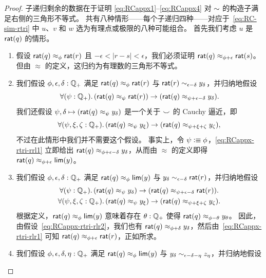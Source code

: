 \begin{proof}
  子递归剩余的数据在于证明 \eqref{eq:RCappx1}--\eqref{eq:RCappx4} 对 $\mathord\sim$ 的构造子满足右侧的三角形不等式。
  共有八种情形——每个子递归四种——对应于~\eqref{eq:RC-sim-rtri} 中 $u$、$v$ 和 $w$ 选为有理点或极限的八种可能组合。
  首先我们考虑 $u$ 是 $\mathsf{rat}(q)$ 的情形。
  \begin{enumerate}
  \item 假设 $\mathsf{rat}(q)\approx_\phi \mathsf{rat}(r)$ 且 $-\epsilon<|r-s|<\epsilon$，我们必须证明 $\mathsf{rat}(q)\approx_{\phi+\epsilon} \mathsf{rat}(s)$。
    但由 $\approx$ 的定义，这归约为有理数的三角形不等式。
  \item 我们假设 $\phi,\epsilon,\delta:\mathbb{Q}_{+}$ 满足 $\mathsf{rat}(q)\approx_\phi \mathsf{rat}(r)$ 与 $\mathsf{rat}(r) \sim_{\epsilon-\delta} y_\delta$，并归纳地假设
    \begin{equation}
      \fall{\psi:\Qp}(\rcrat(q) \approx_{\psi} \rcrat(r)) \to (\rcrat(q) \approx_{\psi+\epsilon-\delta} y_\delta).\label{eq:RCappx-rtri-rrl1}
    \end{equation}
    我们还假设 $\psi,\delta\mapsto (\mathsf{rat}(q) \approx_{\psi} y_\delta)$ 是一个关于 $\smile$ 的 Cauchy 逼近，即
    \begin{equation}
      \fall{\psi,\xi,\zeta:\Qp} (\rcrat(q) \approx_{\psi} y_\xi) \to (\rcrat(q) \approx_{\psi+\xi+\zeta} y_\zeta),\label{eq:RCappx-rtri-rrl2}
    \end{equation}
    不过在此情形中我们并不需要这个假设。
    事实上，令 $\psi\vcentcolon\equiv \phi$，\eqref{eq:RCappx-rtri-rrl1} 立即给出 $\mathsf{rat}(q) \approx_{\phi+\epsilon-\delta} y_\delta$，从而由 $\approx$ 的定义即得 $\mathsf{rat}(q) \approx_{\phi+\epsilon} \mathsf{lim}(y)$。
  \item 我们假设 $\phi,\epsilon,\delta:\mathbb{Q}_{+}$ 满足 $\mathsf{rat}(q)\approx_\phi \mathsf{lim}(y)$ 与 $y_\delta \sim_{\epsilon-\delta} \mathsf{rat}(r)$，并归纳地假设
    \begin{gather}
      \fall{\psi:\Qp}(\rcrat(q) \approx_{\psi} y_\delta) \to (\rcrat(q) \approx_{\psi+\epsilon-\delta} \rcrat(r)).\label{eq:RCappx-rtri-rlr1}\\
      \fall{\psi,\xi,\zeta:\Qp} (\rcrat(q) \approx_{\psi} y_\xi) \to (\rcrat(q) \approx_{\psi+\xi+\zeta} y_\zeta).\label{eq:RCappx-rtri-rlr2}
    \end{gather}
    根据定义，$\mathsf{rat}(q)\approx_\phi \mathsf{lim}(y)$ 意味着存在 $\theta:\mathbb{Q}_{+}$ 使得 $\mathsf{rat}(q) \approx_{\phi-\theta} y_\theta$。
    因此，由假设~\eqref{eq:RCappx-rtri-rlr2}，我们也有 $\mathsf{rat}(q) \approx_{\phi+\delta} y_\delta$，然后由~\eqref{eq:RCappx-rtri-rlr1} 可知 $\mathsf{rat}(q) \approx_{\phi+\epsilon} \mathsf{rat}(r)$，正如所求。
  \item 我们假设 $\phi,\epsilon,\delta,\eta:\mathbb{Q}_{+}$ 满足 $\mathsf{rat}(q)\approx_\phi \mathsf{lim}(y)$ 与 $y_\delta \sim_{\epsilon-\delta-\eta} z_\eta$，并归纳地假设

\end{enumerate}
\end{proof}
